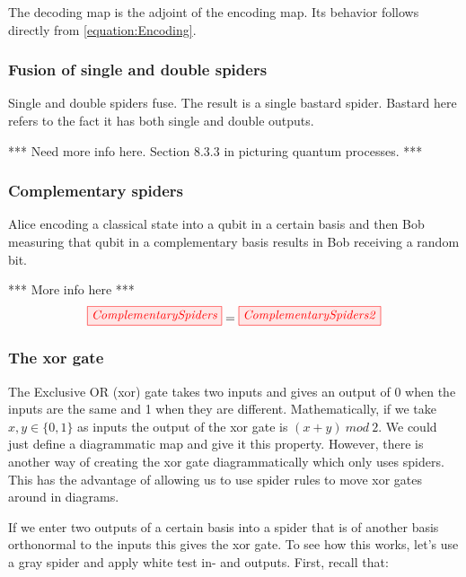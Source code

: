 \documentclass[]{article}
\begin{document}
The decoding map is the adjoint of the encoding map. Its behavior follows directly from \ref{equation:Encoding}.





\subsubsection{Fusion of single and double spiders}
\label{singleanddoublespiderfusion}

Single and double spiders fuse. The result is a single bastard spider. Bastard here refers to the fact it has both single and double outputs.

*** Need more info here. Section 8.3.3 in picturing quantum processes. ***



\subsubsection{Complementary spiders}
\label{complementarity}
Alice encoding a classical state into a qubit in a certain basis and then Bob measuring that qubit in a complementary basis results in Bob receiving a random bit.

*** More info here ***
\begin{equation}
	\tikzfig{ComplementarySpiders} = \tikzfig{ComplementarySpiders2}
\end{equation}

\subsubsection{The xor gate}

\label{xorgate}

The Exclusive OR (xor) gate takes two inputs and gives an output of 0 when the inputs are the same and 1 when they are different. Mathematically, if we take $x, y \in \{0,1\} $ as inputs the output of the xor gate is $(x + y)~mod~2$. We could just define a diagrammatic map and give it this property. However, there is another way of creating the xor gate diagrammatically which only uses spiders. This has the advantage of allowing us to use spider rules to move xor gates around in diagrams.

If we enter two outputs of a certain basis into a spider that is of another basis orthonormal to the inputs this gives the xor gate. To see how this works, let's use a gray spider and apply white test in- and outputs. First, recall that:
\end{document}
